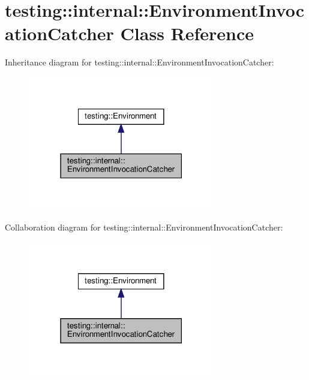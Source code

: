 \hypertarget{classtesting_1_1internal_1_1_environment_invocation_catcher}{}\section{testing\+:\+:internal\+:\+:Environment\+Invocation\+Catcher Class Reference}
\label{classtesting_1_1internal_1_1_environment_invocation_catcher}


Inheritance diagram for testing\+:\+:internal\+:\+:Environment\+Invocation\+Catcher\+:
\nopagebreak
\begin{figure}[H]
\begin{center}
\leavevmode
\includegraphics[width=231pt]{classtesting_1_1internal_1_1_environment_invocation_catcher__inherit__graph}
\end{center}
\end{figure}


Collaboration diagram for testing\+:\+:internal\+:\+:Environment\+Invocation\+Catcher\+:
\nopagebreak
\begin{figure}[H]
\begin{center}
\leavevmode
\includegraphics[width=231pt]{classtesting_1_1internal_1_1_environment_invocation_catcher__coll__graph}
\end{center}
\end{figure}
